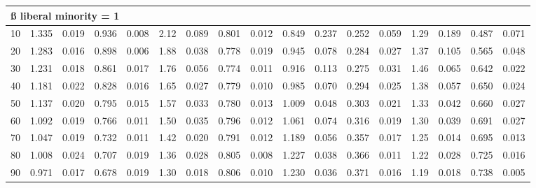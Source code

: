 \documentclass[
]{article}
\begin{document}
\begin{table}[H]
\begin{table}
{\begin{tabular}{r|r|r|r|r|r|r|r|r|r|r|r|r|r|r|r|r}
\hline
\multicolumn{17}{l}{\textbf{ß liberal minority = 1}}\\
\hline
\hspace{1em}10 & 1.335 & 0.019 & 0.936 & 0.008 & 2.12 & 0.089 & 0.801 & 0.012 & 0.849 & 0.237 & 0.252 & 0.059 & 1.29 & 0.189 & 0.487 & 0.071\\
\hline
\hspace{1em}20 & 1.283 & 0.016 & 0.898 & 0.006 & 1.88 & 0.038 & 0.778 & 0.019 & 0.945 & 0.078 & 0.284 & 0.027 & 1.37 & 0.105 & 0.565 & 0.048\\
\hline
\hspace{1em}30 & 1.231 & 0.018 & 0.861 & 0.017 & 1.76 & 0.056 & 0.774 & 0.011 & 0.916 & 0.113 & 0.275 & 0.031 & 1.46 & 0.065 & 0.642 & 0.022\\
\hline
\hspace{1em}40 & 1.181 & 0.022 & 0.828 & 0.016 & 1.65 & 0.027 & 0.779 & 0.010 & 0.985 & 0.070 & 0.294 & 0.025 & 1.38 & 0.057 & 0.650 & 0.024\\
\hline
\hspace{1em}50 & 1.137 & 0.020 & 0.795 & 0.015 & 1.57 & 0.033 & 0.780 & 0.013 & 1.009 & 0.048 & 0.303 & 0.021 & 1.33 & 0.042 & 0.660 & 0.027\\
\hline
\hspace{1em}60 & 1.092 & 0.019 & 0.766 & 0.011 & 1.50 & 0.035 & 0.796 & 0.012 & 1.061 & 0.074 & 0.316 & 0.019 & 1.30 & 0.039 & 0.691 & 0.027\\
\hline
\hspace{1em}70 & 1.047 & 0.019 & 0.732 & 0.011 & 1.42 & 0.020 & 0.791 & 0.012 & 1.189 & 0.056 & 0.357 & 0.017 & 1.25 & 0.014 & 0.695 & 0.013\\
\hline
\hspace{1em}80 & 1.008 & 0.024 & 0.707 & 0.019 & 1.36 & 0.028 & 0.805 & 0.008 & 1.227 & 0.038 & 0.366 & 0.011 & 1.22 & 0.028 & 0.725 & 0.016\\
\hline
\hspace{1em}90 & 0.971 & 0.017 & 0.678 & 0.019 & 1.30 & 0.018 & 0.806 & 0.010 & 1.230 & 0.036 & 0.371 & 0.016 & 1.19 & 0.018 & 0.738 & 0.005\\
\hline
\end{tabular}}
\end{table}
\end{table}
\end{document}
